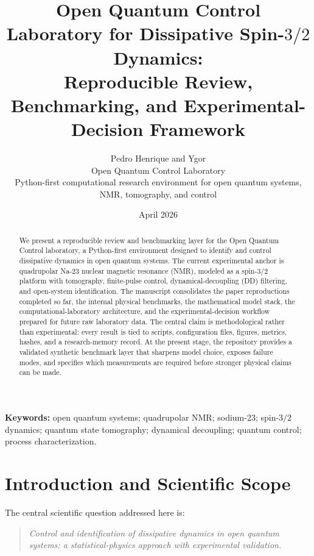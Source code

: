 \documentclass[11pt,a4paper]{article}
\title{\textbf{Open Quantum Control Laboratory for Dissipative Spin-$3/2$ Dynamics:}\\
\large Reproducible Review, Benchmarking, and Experimental-Decision Framework}
\author{
Pedro Henrique and Ygor\\
\small Open Quantum Control Laboratory\\
\small Python-first computational research environment for open quantum systems, NMR, tomography, and control
}
\date{April 2026}
\begin{document}
\maketitle

\begin{abstract}
We present a reproducible review and benchmarking layer for the Open Quantum
Control laboratory, a Python-first environment designed to identify and control
dissipative dynamics in open quantum systems.  The current experimental anchor
is quadrupolar Na-23 nuclear magnetic resonance (NMR), modeled as a spin-$3/2$
platform with tomography, finite-pulse control, dynamical-decoupling (DD)
filtering, and open-system identification.  The manuscript consolidates the
paper reproductions completed so far, the internal physical benchmarks, the
mathematical model stack, the computational-laboratory architecture, and the
experimental-decision workflow prepared for future raw laboratory data.  The
central claim is methodological rather than experimental: every result is tied
to scripts, configuration files, figures, metrics, hashes, and a research-memory
record.  At the present stage, the repository provides a validated synthetic
benchmark layer that sharpens model choice, exposes failure modes, and specifies
which measurements are required before stronger physical claims can be made.
\end{abstract}

\noindent\textbf{Keywords:} open quantum systems; quadrupolar NMR; sodium-23;
spin-$3/2$ dynamics; quantum state tomography; dynamical decoupling; quantum
control; process characterization.

\section{Introduction and Scientific Scope}

The central scientific question addressed here is:
\begin{quote}
\emph{Control and identification of dissipative dynamics in open quantum systems:
a statistical-physics approach with experimental validation.}
\end{quote}
\end{document}
